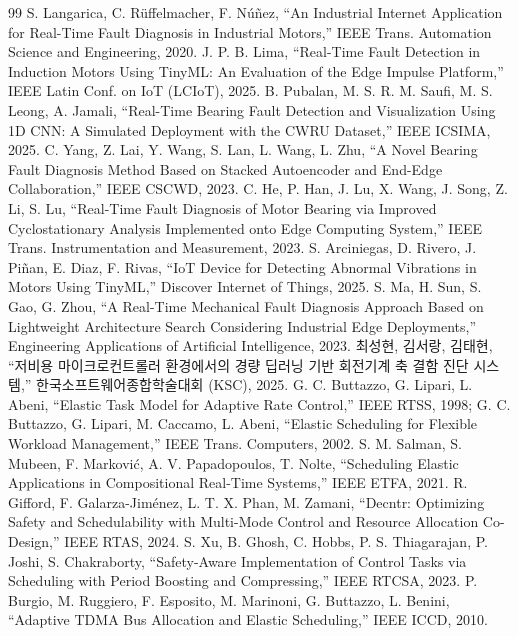 \documentclass[10pt]{article}
\begin{document}
\begin{thebibliography}{99}\footnotesize
{} S. Langarica, C. R\"uffelmacher, F. N\'u\~nez, ``An Industrial Internet Application for Real-Time Fault Diagnosis in Industrial Motors,'' IEEE Trans. Automation Science and Engineering, 2020.
 J. P. B. Lima, ``Real-Time Fault Detection in Induction Motors Using TinyML: An Evaluation of the Edge Impulse Platform,'' IEEE Latin Conf. on IoT (LCIoT), 2025.
 B. Pubalan, M. S. R. M. Saufi, M. S. Leong, A. Jamali, ``Real-Time Bearing Fault Detection and Visualization Using 1D CNN: A Simulated Deployment with the CWRU Dataset,'' IEEE ICSIMA, 2025.
 C. Yang, Z. Lai, Y. Wang, S. Lan, L. Wang, L. Zhu, ``A Novel Bearing Fault Diagnosis Method Based on Stacked Autoencoder and End-Edge Collaboration,'' IEEE CSCWD, 2023.
 C. He, P. Han, J. Lu, X. Wang, J. Song, Z. Li, S. Lu, ``Real-Time Fault Diagnosis of Motor Bearing via Improved Cyclostationary Analysis Implemented onto Edge Computing System,'' IEEE Trans. Instrumentation and Measurement, 2023.
 S. Arciniegas, D. Rivero, J. Pi\~nan, E. Diaz, F. Rivas, ``IoT Device for Detecting Abnormal Vibrations in Motors Using TinyML,'' Discover Internet of Things, 2025.
 S. Ma, H. Sun, S. Gao, G. Zhou, ``A Real-Time Mechanical Fault Diagnosis Approach Based on Lightweight Architecture Search Considering Industrial Edge Deployments,'' Engineering Applications of Artificial Intelligence, 2023.
 최성현, 김서랑, 김태현, ``저비용 마이크로컨트롤러 환경에서의 경량 딥러닝 기반 회전기계 축 결함 진단 시스템,'' 한국소프트웨어종합학술대회 (KSC), 2025.
 G. C. Buttazzo, G. Lipari, L. Abeni, ``Elastic Task Model for Adaptive Rate Control,'' IEEE RTSS, 1998; G. C. Buttazzo, G. Lipari, M. Caccamo, L. Abeni, ``Elastic Scheduling for Flexible Workload Management,'' IEEE Trans. Computers, 2002.
 S. M. Salman, S. Mubeen, F. Markovi\'c, A. V. Papadopoulos, T. Nolte, ``Scheduling Elastic Applications in Compositional Real-Time Systems,'' IEEE ETFA, 2021.
 R. Gifford, F. Galarza-Jim\'enez, L. T. X. Phan, M. Zamani, ``Decntr: Optimizing Safety and Schedulability with Multi-Mode Control and Resource Allocation Co-Design,'' IEEE RTAS, 2024.
 S. Xu, B. Ghosh, C. Hobbs, P. S. Thiagarajan, P. Joshi, S. Chakraborty, ``Safety-Aware Implementation of Control Tasks via Scheduling with Period Boosting and Compressing,'' IEEE RTCSA, 2023.
 P. Burgio, M. Ruggiero, F. Esposito, M. Marinoni, G. Buttazzo, L. Benini, ``Adaptive TDMA Bus Allocation and Elastic Scheduling,'' IEEE ICCD, 2010.

\end{thebibliography}
\end{document}
